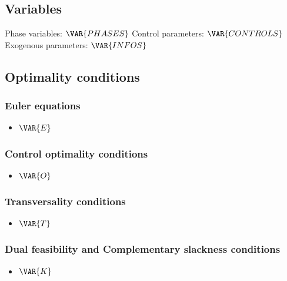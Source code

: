 \documentclass{article}
\begin{document}
\subsection{Variables}

Phase variables: $\VAR{PHASES}$
\newline
Control parameters: $\VAR{CONTROLS}$
\newline
Exogenous parameters: $\VAR{INFOS}$

\subsection{Optimality conditions}
\subsubsection{Euler equations}
\begin{itemize}
    \item $\VAR{E}$
\end{itemize}

\subsubsection{Control optimality conditions}
\begin{itemize}
    \item $\VAR{O}$
\end{itemize}

\subsubsection{Transversality conditions}
\begin{itemize}
    \item $\VAR{T}$
\end{itemize}

\subsubsection{Dual feasibility and Complementary slackness conditions}
\begin{itemize}
    \item $\VAR{K}$
\end{itemize}
\end{document}
